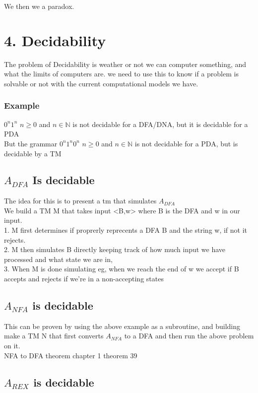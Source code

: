 \documentclass[a4paper,10pt,titlepage]{report}
\begin{document}
We then we a paradox.\\



\newpage
\section{4. Decidability}
The problem of Decidability is weather or not we can computer something, and what the limits of computers are. we need to use this to know if a problem is solvable or not with the current computational models we have.

\subsubsection{Example}
$0^n1^n $   $ n \geq 0 $ and $n \in \mathbb{N}$ is not decidable for a DFA/DNA, but it is decidable for a PDA\\
But the grammar $0^n1^n0^n $   $ n \geq 0 $ and $n \in \mathbb{N}$ is not decidable for a PDA, but is decidable by a TM

\subsection{$A_{DFA} $ Is decidable}
The idea for this is to present a tm that simulates $A_{DFA}$\\
We build a TM M that takes input <B,w> where B is the DFA and w in our input.\\
1. M first determines if proprerly reprecents a DFA B and the string w, if not it rejects. \\
2. M then simulates B directly keeping track of how much input we have processed and what state we are in, \\
3. When M is done simulating eg, when we reach the end of w we accept if B accepts and rejects if we're in a non-accepting states\\
\subsection{$A_{NFA}$ is decidable}

This can be proven by using the above example as a subroutine, and building make a TM N that first converts $A_{NFA}$ to  a DFA and then run the above problem on it.\\

NFA to DFA theorem chapter 1 theorem 39

\subsection{$A_{REX}$ is decidable}
\end{document}

